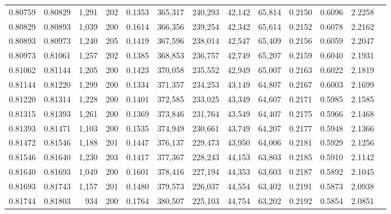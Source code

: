 \begin{tabular}{rrrrrrrrrrrrr}
0.80759 & 0.80829 & 1,291 & 202 &                                     0.1353 & 365,317 & 240,293 &  42,142 &  65,814 & 0.2150 & 0.6096 & 2.2258 \\
0.80829 & 0.80893 & 1,039 & 200 &                                     0.1614 & 366,356 & 239,254 &  42,342 &  65,614 & 0.2152 & 0.6078 & 2.2162 \\
0.80893 & 0.80973 & 1,240 & 205 &                                     0.1419 & 367,596 & 238,014 &  42,547 &  65,409 & 0.2156 & 0.6059 & 2.2047 \\
0.80973 & 0.81061 & 1,257 & 202 &                                     0.1385 & 368,853 & 236,757 &  42,749 &  65,207 & 0.2159 & 0.6040 & 2.1931 \\
0.81062 & 0.81144 & 1,205 & 200 &                                     0.1423 & 370,058 & 235,552 &  42,949 &  65,007 & 0.2163 & 0.6022 & 2.1819 \\
0.81144 & 0.81220 & 1,299 & 200 &                                     0.1334 & 371,357 & 234,253 &  43,149 &  64,807 & 0.2167 & 0.6003 & 2.1699 \\
0.81220 & 0.81314 & 1,228 & 200 &                                     0.1401 & 372,585 & 233,025 &  43,349 &  64,607 & 0.2171 & 0.5985 & 2.1585 \\
0.81315 & 0.81393 & 1,261 & 200 &                                     0.1369 & 373,846 & 231,764 &  43,549 &  64,407 & 0.2175 & 0.5966 & 2.1468 \\
0.81393 & 0.81471 & 1,103 & 200 &                                     0.1535 & 374,949 & 230,661 &  43,749 &  64,207 & 0.2177 & 0.5948 & 2.1366 \\
0.81472 & 0.81546 & 1,188 & 201 &                                     0.1447 & 376,137 & 229,473 &  43,950 &  64,006 & 0.2181 & 0.5929 & 2.1256 \\
0.81546 & 0.81640 & 1,230 & 203 &                                     0.1417 & 377,367 & 228,243 &  44,153 &  63,803 & 0.2185 & 0.5910 & 2.1142 \\
0.81640 & 0.81693 & 1,049 & 200 &                                     0.1601 & 378,416 & 227,194 &  44,353 &  63,603 & 0.2187 & 0.5892 & 2.1045 \\
0.81693 & 0.81743 & 1,157 & 201 &                                     0.1480 & 379,573 & 226,037 &  44,554 &  63,402 & 0.2191 & 0.5873 & 2.0938 \\
0.81744 & 0.81803 &   934 & 200 &                                     0.1764 & 380,507 & 225,103 &  44,754 &  63,202 & 0.2192 & 0.5854 & 2.0851 \\

\end{tabular}
